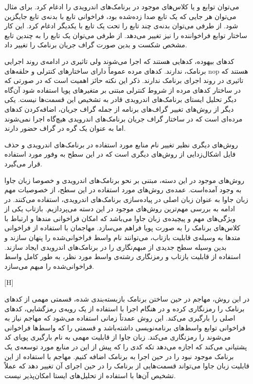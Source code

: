   می‌توان توابع و یا کلاس‌های موجود در برنامک‌های اندرویدی را ادغام کرد. برای مثال می‌توان هر جایی که یک تابع صدا زده‌شده بود، فراخوانی تابع با بدنه‌ی تابع جایگزین شود. از طرفی می‌توان بدنه‌ی چند تابع را تحت یک تابع با یکدیگر ادغام کرد. این کار ساختار توابع فراخواننده را نیز تغییر می‌دهد. از طرفی می‌توان یک تابع را به چندین تابع مشخص شکست و بدین صورت گراف جریان برنامک‌ را تغییر داد.

  کد‌های بیهوده‌، کد‌هایی هستند که اجرا می‌شوند ولی تاثیری در ادامه‌ی روند اجرایی برنامک، ندارند. کد‌های مرده عموماً دارای ساختار‌های کنترلی و حلقه‌های nop هستند که تاثیری در روند اجرای برنامک ندارند. ذکر این نکته حائز اهمیت است که در صورتی که در ساختار کد‌های مرده از شروط کنترلی مبتنی بر متغیر‌های پویا استفاده شود آن‌گاه دیگر تحلیل ایستای برنامک‌های اندرویدی قادر به تشخیص این قسمت‌ها نیست.
 
یکی دیگر از روش‌های تغییر گراف‌های برنامه از جمله گراف جریان، اضافه‌کردن کد‌های مرده‌ای است که در ساختار گراف‌ جریان برنامک‌های اندرویدی هیچ‌گاه اجرا نمی‌شوند اما به عنوان یک گره در گراف حضور دارند. 
 
   روش‌های دیگری نظیر تغییر نام منابع مورد استفاده در برنامک‌های اندرویدی و حذف فایل اشکال‌زدایی از روش‌های دیگری است که در این سطح به وفور مورد استفاده قرار می‌گیرد.

\label{khakestari}
روش‌های موجود در این دسته، مبتنی بر نحو برنامک‌های اندرویدی و خصوصا زبان جاوا به وجود آمده‌است. عمده‌ی روش‌های مورد استفاده در این سطح، از خصوصیات مهم زبان جاوا به عنوان زبان اصلی در پیاده‌سازی برنامک‌های اندرویدی، استفاده می‌کنند. در ادامه به بررسی مهم‌ترین روش‌های موجود در این دسته می‌پردازیم.
  بازتاب یکی از ویژگی‌های مهم و پیچیده‌ی زبان جاوا می‌باشد که امکان فراخوانی‌ مند‌ها و ارتباط با کلاس‌های برنامک را به صورت پویا فراهم می‌سازد. مهاجمان با استفاده از فراخوانی متد‌ها به وسیله‌ی قابلیت بازتاب، می‌توانند نام واسط فراخوانی‌شده را پنهان سازند و بدین وسیله سطح جدیدی از مبهم‌نگاری را در برنامک‌های اندرویدی ایجاد سازند. استفاده از قابلیت بازتاب و رمز‌نگاری رشته‌ی واسط مورد نظر، به طور کامل واسط فراخوانی‌شده را مبهم می‌سازد. 


[H]
\vspace{1em}

 در این روش، مهاجم در حین ساختن برنامک‌ بازبسته‌بندی شده، قسمتی مهمی از کد‌های برنامک را رمز‌نگاری کرده و در هنگام اجرا با استفاده از یک رویه‌ی رمز‌گشایی، کد‌های اصلی را بارگیری می‌کند. این روش عمدتاً زمانی استفاده می‌شود که مهاجم نیاز به فراخوانی توابع واسط‌های برنامه‌نویسی داشته‌باشد و قسمتی را که واسط‌ها فراخوانی می‌شوند را رمزنگاری می‌کند.
 زبان جاوا از قابلیت مهمی به نام بارگیری پویا‌ی کد پشتیانی می‌کند که اجازه می‌دهد تکه کدی را که پیش از این در منابع مورد توسعه‌ی یک برنامک موجود نبود را در حین اجرا به برنامک اضافه کنیم. مهاجم با استفاده از این قابلیت زبان‌ جاوا می‌تواند قسمت‌هایی از برنامک‌ را در حین اجرای آن تغییر دهد که عملاً تشخیص آن‌ها با استفاده از تحلیل‌های ایستا امکان‌‌پذیر نیست.

